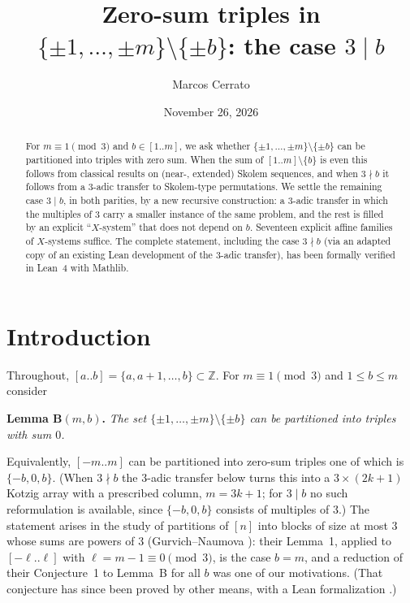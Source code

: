\documentclass[11pt]{amsart}
\title[Zero-sum triples in $\{\pm1,\dots,\pm m\}\setminus\{\pm b\}$]{Zero-sum triples in
$\{\pm1,\dots,\pm m\}\setminus\{\pm b\}$: the case $3\mid b$}
\author{Marcos Cerrato}
\date{November 26, 2026}
\theoremstyle{definition}
\theoremstyle{remark}
\newcommand{\Z}{\mathbb{Z}}
\newcommand{\Icc}[2]{[#1..#2]}
\begin{document}
\begin{abstract}
For $m\equiv 1\pmod 3$ and $b\in[1..m]$, we ask whether $\{\pm1,\dots,\pm m\}\setminus\{\pm b\}$ can be
partitioned into triples with zero sum. When the sum of $[1..m]\setminus\{b\}$ is even this follows from
classical results on (near-, extended) Skolem sequences, and when $3\nmid b$ it follows from a $3$-adic transfer
to Skolem-type permutations. We settle the remaining case $3\mid b$, in both parities, by a new recursive
construction: a $3$-adic transfer in which the multiples of $3$ carry a smaller instance of the same problem,
and the rest is filled by an explicit ``$X$-system'' that does not depend on $b$. Seventeen explicit affine families
of $X$-systems suffice. The complete statement, including the case $3\nmid b$ (via an adapted copy of an
existing Lean development of the $3$-adic transfer), has been formally verified in Lean~4 with Mathlib.
\end{abstract}

\maketitle

\section{Introduction}

Throughout, $\Icc{a}{b}=\{a,a+1,\dots,b\}\subset\Z$. For $m\equiv1\pmod 3$ and $1\le b\le m$ consider

\smallskip
\noindent\textbf{Lemma B$(m,b)$.} \emph{The set $\{\pm1,\dots,\pm m\}\setminus\{\pm b\}$ can be partitioned into
triples with sum $0$.}
\smallskip

Equivalently, $\Icc{-m}{m}$ can be partitioned into zero-sum triples one of which is $\{-b,0,b\}$. (When
$3\nmid b$ the $3$-adic transfer below turns this into a $3\times(2k+1)$ Kotzig array with a prescribed column,
$m=3k+1$; for $3\mid b$ no such reformulation is available, since $\{-b,0,b\}$ consists of multiples of $3$.)
The statement arises in the study of partitions of $[n]$ into blocks of size at most $3$ whose sums are powers of
$3$ (Gurvich--Naumova \cite{GN}): their Lemma~1, applied to $[-\ell..\ell]$ with $\ell=m-1\equiv0\pmod 3$, is the
case $b=m$, and a reduction of their Conjecture~1 to
Lemma~B for all $b$ was one of our motivations. (That conjecture has since been proved by other means, with a Lean formalization \cite{Jo}.)
\end{document}
